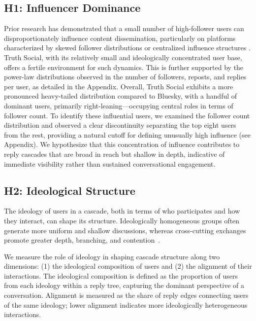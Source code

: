 \documentclass[letterpaper]{article} %
\begin{document}
\subsection{H1: Influencer Dominance}
Prior research has demonstrated that a small number of high-follower users can disproportionately influence content dissemination, particularly on platforms characterized by skewed follower distributions or centralized influence structures \cite{goel_structural_2016, zannettou_what_2018}. Truth Social, with its relatively small and ideologically concentrated user base, offers a fertile environment for such dynamics. This is further supported by the power-law distributions observed in the number of followers, reposts, and replies per user, as detailed in the Appendix. Overall, Truth Social exhibits a more pronounced heavy-tailed distribution compared to Bluesky, with a handful of dominant users, primarily right-leaning—occupying central roles in terms of follower count. To identify these influential users, we examined the follower count distribution and observed a clear discontinuity separating the top eight users from the rest, providing a natural cutoff for defining unusually high influence (see Appendix). We hypothesize that this concentration of influence contributes to reply cascades that are broad in reach but shallow in depth, indicative of immediate visibility rather than sustained conversational engagement.

\subsection{H2: Ideological Structure}
The ideology of users in a cascade, both in terms of who participates and how they interact, can shape its structure. Ideologically homogeneous groups often generate more uniform and shallow discussions, whereas cross-cutting exchanges promote greater depth, branching, and contention~\cite{conover_political_2011, garimella_political_2018, barbera_tweeting_2015, adamic_political_2005, guess_how_2023}.

We measure the role of ideology in shaping cascade structure along two dimensions: (1) the ideological composition of users and (2) the alignment of their interactions. The ideological composition is defined as the proportion of users from each ideology within a reply tree, capturing the dominant perspective of a conversation. Alignment is measured as the share of reply edges connecting users of the same ideology; lower alignment indicates more ideologically heterogeneous interactions. 
\end{document}

